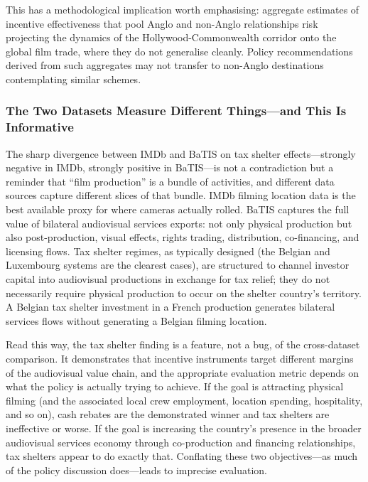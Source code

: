This has a methodological implication worth emphasising: aggregate estimates of incentive effectiveness that pool Anglo and non-Anglo relationships risk projecting the dynamics of the Hollywood-Commonwealth corridor onto the global film trade, where they do not generalise cleanly. Policy recommendations derived from such aggregates may not transfer to non-Anglo destinations contemplating similar schemes.

\subsubsection{The Two Datasets Measure Different Things---and This Is Informative}

The sharp divergence between IMDb and BaTIS on tax shelter effects---strongly negative in IMDb, strongly positive in BaTIS---is not a contradiction but a reminder that ``film production'' is a bundle of activities, and different data sources capture different slices of that bundle. IMDb filming location data is the best available proxy for where cameras actually rolled. BaTIS captures the full value of bilateral audiovisual services exports: not only physical production but also post-production, visual effects, rights trading, distribution, co-financing, and licensing flows. Tax shelter regimes, as typically designed (the Belgian and Luxembourg systems are the clearest cases), are structured to channel investor capital into audiovisual productions in exchange for tax relief; they do not necessarily require physical production to occur on the shelter country's territory. A Belgian tax shelter investment in a French production generates bilateral services flows without generating a Belgian filming location.

Read this way, the tax shelter finding is a feature, not a bug, of the cross-dataset comparison. It demonstrates that incentive instruments target different margins of the audiovisual value chain, and the appropriate evaluation metric depends on what the policy is actually trying to achieve. If the goal is attracting physical filming (and the associated local crew employment, location spending, hospitality, and so on), cash rebates are the demonstrated winner and tax shelters are ineffective or worse. If the goal is increasing the country's presence in the broader audiovisual services economy through co-production and financing relationships, tax shelters appear to do exactly that. Conflating these two objectives---as much of the policy discussion does---leads to imprecise evaluation.

